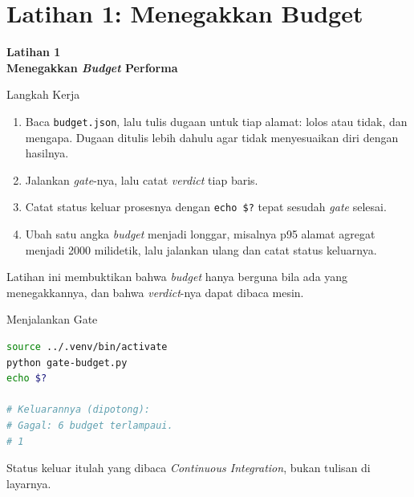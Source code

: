 \documentclass[aspectratio=169, table, 12pt]{beamer}
\begin{document}
\section{Latihan 1: Menegakkan Budget}

\begin{frame}{\hfill}
  \centering
  \Huge{\textbf{Latihan 1\\Menegakkan \textit{Budget} Performa}}
\end{frame}

\begin{frame}{{\Large Langkah Kerja}}
  \vspace{6pt}
  \begin{enumerate}
    \item Baca \texttt{budget.json}, lalu tulis dugaan untuk tiap alamat:
          lolos atau tidak, dan mengapa. Dugaan ditulis lebih dahulu agar
          tidak menyesuaikan diri dengan hasilnya.
    \item Jalankan \textit{gate}-nya, lalu catat \textit{verdict} tiap baris.
    \item Catat status keluar prosesnya dengan \texttt{echo \$?} tepat
          sesudah \textit{gate} selesai.
    \item Ubah satu angka \textit{budget} menjadi longgar, misalnya p95 alamat
          agregat menjadi 2000 milidetik, lalu jalankan ulang dan catat
          status keluarnya.
  \end{enumerate}
  \vspace{4pt}
  {\footnotesize Latihan ini membuktikan bahwa \textit{budget} hanya berguna bila
  ada yang menegakkannya, dan bahwa \textit{verdict}-nya dapat dibaca mesin.}
\end{frame}

\begin{frame}[fragile]{{\Large Menjalankan Gate}}
  \vspace{2pt}
\begin{lstlisting}[language=bash]
source ../.venv/bin/activate
python gate-budget.py
echo $?

# Keluarannya (dipotong):
# Gagal: 6 budget terlampaui.
# 1
\end{lstlisting}
  \vspace{4pt}
  {\footnotesize Status keluar itulah yang dibaca \textit{Continuous
  Integration}, bukan tulisan di layarnya.}
\end{frame}
\end{document}
